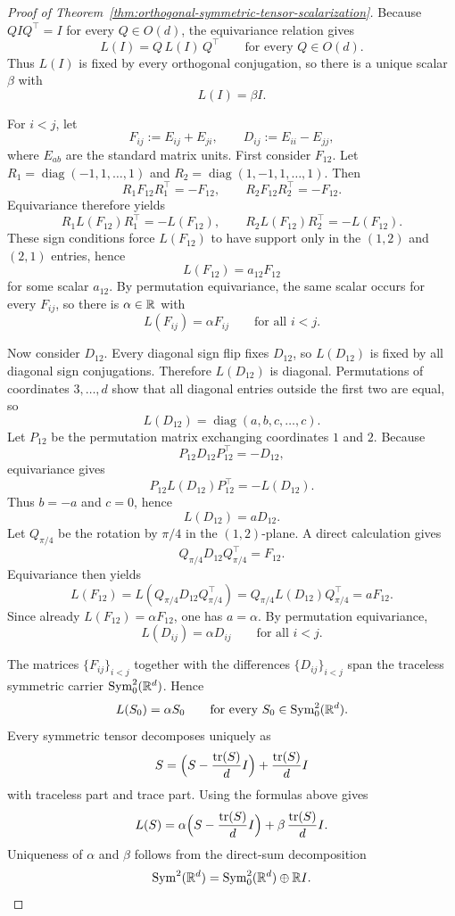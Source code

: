 \begin{proof}[Proof of Theorem~\ref{thm:orthogonal-symmetric-tensor-scalarization}]
\label{proof:thm:orthogonal-symmetric-tensor-scalarization}
Because $QIQ^\top=I$ for every $Q\in O(d)$, the equivariance relation gives
\[
L(I)=Q\,L(I)\,Q^\top
\qquad\text{for every }Q\in O(d).
\]
Thus $L(I)$ is fixed by every orthogonal conjugation, so there is a unique
scalar $\beta$ with
\[
L(I)=\beta I.
\]

For $i<j$, let
\[
F_{ij}:=E_{ij}+E_{ji},
\qquad
D_{ij}:=E_{ii}-E_{jj},
\]
where $E_{ab}$ are the standard matrix units. First consider $F_{12}$. Let
$R_1=\operatorname{diag}(-1,1,\dots,1)$ and
$R_2=\operatorname{diag}(1,-1,1,\dots,1)$. Then
\[
R_1F_{12}R_1^\top=-F_{12},
\qquad
R_2F_{12}R_2^\top=-F_{12}.
\]
Equivariance therefore yields
\[
R_1L(F_{12})R_1^\top=-L(F_{12}),
\qquad
R_2L(F_{12})R_2^\top=-L(F_{12}).
\]
These sign conditions force $L(F_{12})$ to have support only in the
$(1,2)$ and $(2,1)$ entries, hence
\[
L(F_{12})=a_{12}F_{12}
\]
for some scalar $a_{12}$. By permutation equivariance, the same scalar occurs
for every $F_{ij}$, so there is $\alpha\in\mathbb{R}$ with
\[
L(F_{ij})=\alpha F_{ij}
\qquad\text{for all }i<j.
\]

Now consider $D_{12}$. Every diagonal sign flip fixes $D_{12}$, so $L(D_{12})$
is fixed by all diagonal sign conjugations. Therefore $L(D_{12})$ is diagonal.
Permutations of coordinates $3,\dots,d$ show that all diagonal entries outside
the first two are equal, so
\[
L(D_{12})=\operatorname{diag}(a,b,c,\dots,c).
\]
Let $P_{12}$ be the permutation matrix exchanging coordinates $1$ and $2$.
Because
\[
P_{12}D_{12}P_{12}^\top=-D_{12},
\]
equivariance gives
\[
P_{12}L(D_{12})P_{12}^\top=-L(D_{12}).
\]
Thus $b=-a$ and $c=0$, hence
\[
L(D_{12})=aD_{12}.
\]
Let $Q_{\pi/4}$ be the rotation by $\pi/4$ in the $(1,2)$-plane. A direct
calculation gives
\[
Q_{\pi/4}D_{12}Q_{\pi/4}^\top=F_{12}.
\]
Equivariance then yields
\[
L(F_{12})
=
L(Q_{\pi/4}D_{12}Q_{\pi/4}^\top)
=
Q_{\pi/4}L(D_{12})Q_{\pi/4}^\top
=
aF_{12}.
\]
Since already $L(F_{12})=\alpha F_{12}$, one has $a=\alpha$. By permutation
equivariance,
\[
L(D_{ij})=\alpha D_{ij}
\qquad\text{for all }i<j.
\]

The matrices $\{F_{ij}\}_{i<j}$ together with the differences
$\{D_{ij}\}_{i<j}$ span the traceless symmetric carrier
$\mathrm{Sym}^2_0(\mathbb{R}^d)$. Hence
\[
L(S_0)=\alpha S_0
\qquad\text{for every }S_0\in \mathrm{Sym}^2_0(\mathbb{R}^d).
\]
Every symmetric tensor decomposes uniquely as
\[
S=\Bigl(S-\frac{\operatorname{tr}(S)}{d}I\Bigr)
+\frac{\operatorname{tr}(S)}{d}I
\]
with traceless part and trace part. Using the formulas above gives
\[
L(S)
=
\alpha\Bigl(S-\frac{\operatorname{tr}(S)}{d}I\Bigr)
+
\beta\,\frac{\operatorname{tr}(S)}{d}I.
\]
Uniqueness of $\alpha$ and $\beta$ follows from the direct-sum decomposition
\[
\mathrm{Sym}^2(\mathbb{R}^d)=\mathrm{Sym}^2_0(\mathbb{R}^d)\oplus \mathbb{R} I.
\qedhere
\]
\end{proof}


